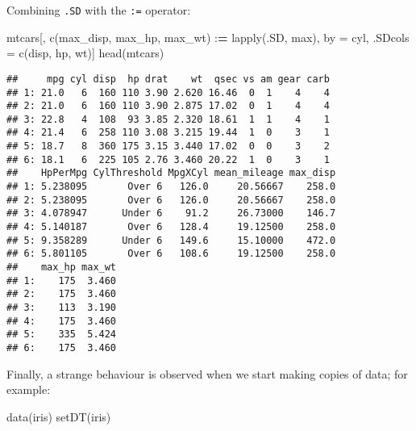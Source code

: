 \documentclass[
]{book}
\newenvironment{Shaded}{\begin{snugshade}}{\end{snugshade}}
\newcommand{\ErrorTok}[1]{\textcolor[rgb]{0.64,0.00,0.00}{\textbf{#1}}}
\newcommand{\FunctionTok}[1]{\textcolor[rgb]{0.00,0.00,0.00}{#1}}
\newcommand{\NormalTok}[1]{#1}
\newcommand{\OtherTok}[1]{\textcolor[rgb]{0.56,0.35,0.01}{#1}}
\newcommand{\SpecialCharTok}[1]{\textcolor[rgb]{0.00,0.00,0.00}{#1}}
\newcommand{\StringTok}[1]{\textcolor[rgb]{0.31,0.60,0.02}{#1}}
\begin{document}
Combining \texttt{.SD} with the \texttt{:=} operator:

\begin{Shaded}
\begin{Highlighting}[]
\NormalTok{mtcars[, }\FunctionTok{c}\NormalTok{(}\StringTok{\textquotesingle{}max\_disp\textquotesingle{}}\NormalTok{, }\StringTok{\textquotesingle{}max\_hp\textquotesingle{}}\NormalTok{, }\StringTok{\textquotesingle{}max\_wt\textquotesingle{}}\NormalTok{) }\SpecialCharTok{:}\ErrorTok{=} \FunctionTok{lapply}\NormalTok{(.SD, max), }
\NormalTok{       by }\OtherTok{=}\NormalTok{ cyl, .SDcols }\OtherTok{=} \FunctionTok{c}\NormalTok{(}\StringTok{\textquotesingle{}disp\textquotesingle{}}\NormalTok{, }\StringTok{\textquotesingle{}hp\textquotesingle{}}\NormalTok{, }\StringTok{\textquotesingle{}wt\textquotesingle{}}\NormalTok{)]}
\FunctionTok{head}\NormalTok{(mtcars)}
\end{Highlighting}
\end{Shaded}

\begin{verbatim}
##     mpg cyl disp  hp drat    wt  qsec vs am gear carb
## 1: 21.0   6  160 110 3.90 2.620 16.46  0  1    4    4
## 2: 21.0   6  160 110 3.90 2.875 17.02  0  1    4    4
## 3: 22.8   4  108  93 3.85 2.320 18.61  1  1    4    1
## 4: 21.4   6  258 110 3.08 3.215 19.44  1  0    3    1
## 5: 18.7   8  360 175 3.15 3.440 17.02  0  0    3    2
## 6: 18.1   6  225 105 2.76 3.460 20.22  1  0    3    1
##    HpPerMpg CylThreshold MpgXCyl mean_mileage max_disp
## 1: 5.238095       Over 6   126.0     20.56667    258.0
## 2: 5.238095       Over 6   126.0     20.56667    258.0
## 3: 4.078947      Under 6    91.2     26.73000    146.7
## 4: 5.140187       Over 6   128.4     19.12500    258.0
## 5: 9.358289      Under 6   149.6     15.10000    472.0
## 6: 5.801105       Over 6   108.6     19.12500    258.0
##    max_hp max_wt
## 1:    175  3.460
## 2:    175  3.460
## 3:    113  3.190
## 4:    175  3.460
## 5:    335  5.424
## 6:    175  3.460
\end{verbatim}

Finally, a strange behaviour is observed when we start making copies of data; for example:

\begin{Shaded}
\begin{Highlighting}[]
\FunctionTok{data}\NormalTok{(iris)}
\FunctionTok{setDT}\NormalTok{(iris)}
\end{Highlighting}
\end{Shaded}
\end{document}
